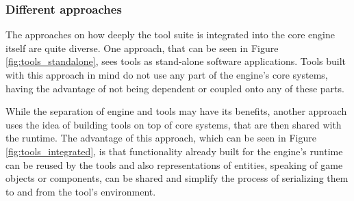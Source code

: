 \subsubsection{Different approaches}

The approaches on how deeply the tool suite is integrated into the core engine itself are quite diverse. One approach, that can be seen in Figure \ref{fig:tools_standalone}, sees tools as stand-alone software applications. Tools built with this approach in mind do not use any part of the engine's core systems, having the advantage of not being dependent or coupled onto any of these parts. 

While the separation of engine and tools may have its benefits, another approach uses the idea of building tools on top of core systems, that are then shared with the runtime. The advantage of this approach, which can be seen in Figure \ref{fig:tools_integrated}, is that functionality already built for the engine's runtime can be reused by the tools and also representations of entities, speaking of game objects or components, can be shared and simplify the process of serializing them to and from the tool's environment.

